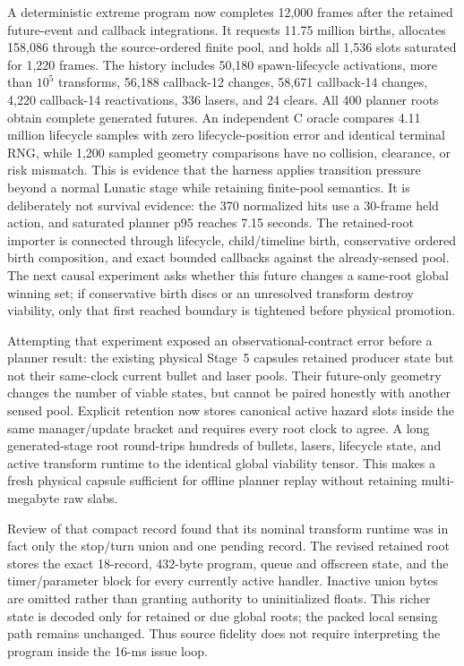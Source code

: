 \documentclass[10pt]{article}
\begin{document}
A deterministic extreme program now completes 12,000 frames after the retained
future-event and callback integrations.  It requests 11.75 million births,
allocates 158,086 through the source-ordered finite pool, and holds all 1,536
slots saturated for 1,220 frames.  The history includes 50,180 spawn-lifecycle
activations, more than $10^5$ transforms, 56,188 callback-12 changes, 58,671
callback-14 changes, 4,220 callback-14 reactivations, 336 lasers, and 24 clears.
All 400 planner roots obtain complete generated futures.  An independent C
oracle compares 4.11 million lifecycle samples with zero lifecycle-position
error and identical terminal RNG, while 1,200 sampled geometry comparisons
have no collision, clearance, or risk mismatch.  This is evidence that the
harness applies transition pressure beyond a normal Lunatic stage while
retaining finite-pool semantics.  It is deliberately not survival evidence:
the 370 normalized hits use a 30-frame held action, and saturated planner p95
reaches 7.15 seconds.  The retained-root importer is connected through
lifecycle, child/timeline birth, conservative ordered birth composition, and
exact bounded callbacks against the already-sensed pool.  The next causal
experiment asks whether this future changes a same-root global winning set; if
conservative birth discs or an unresolved transform destroy viability, only
that first reached boundary is tightened before physical promotion.

Attempting that experiment exposed an observational-contract error before a
planner result: the existing physical Stage~5 capsules retained producer state
but not their same-clock current bullet and laser pools.  Their future-only
geometry changes the number of viable states, but cannot be paired honestly
with another sensed pool.  Explicit retention now stores canonical active
hazard slots inside the same manager/update bracket and requires every root
clock to agree.  A long generated-stage root round-trips hundreds of bullets,
lasers, lifecycle state, and active transform runtime to the identical global
viability tensor.  This makes a fresh physical capsule sufficient for offline
planner replay without retaining multi-megabyte raw slabs.

Review of that compact record found that its nominal transform runtime was in
fact only the stop/turn union and one pending record.  The revised retained
root stores the exact 18-record, 432-byte program, queue and offscreen state,
and the timer/parameter block for every currently active handler.  Inactive
union bytes are omitted rather than granting authority to uninitialized
floats.  This richer state is decoded only for retained or due global roots;
the packed local sensing path remains unchanged.  Thus source fidelity does
not require interpreting the program inside the 16-ms issue loop.
\end{document}
